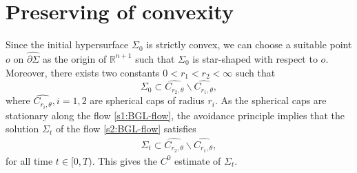 \documentclass[11pt,reqno]{amsart}
\theoremstyle{definition}
\theoremstyle{remark}
\numberwithin{equation}{section}
\renewcommand{\(}{\left(}
\renewcommand{\)}{\right)}
\renewcommand{\-}{\overline}
\renewcommand{\t}{\theta}
\begin{document}
\section{Preserving of convexity}\label{sec:5}

Since the initial hypersurface $\Sigma_0$ is strictly convex, we can choose a suitable point $o$ on $\widehat{\partial\Sigma}$ as the origin of $\mathbb{R}^{n+1}$ such that $\Sigma_0$ is star-shaped with respect to $o$. Moreover, there exists two constants $0<r_1<r_2<\infty$ such that
\begin{equation*}
  \Sigma_0 \subset \widehat{C_{r_2,\t}} \backslash \widehat{C_{r_1,\t}},
\end{equation*}
where $\widehat{C_{r_i,\t}}, i=1,2$ are spherical caps of radius $r_i$. As the spherical caps are stationary along the flow \eqref{s1:BGL-flow}, the avoidance principle implies that the solution $\Sigma_t$ of the flow \eqref{s2:BGL-flow} satisfies
\begin{align}\label{s4:barrier-estimate}
	\Sigma_t \subset \widehat{C_{r_2,\t}} \backslash \widehat{C_{r_1,\t}},
	\end{align}
for all time  $t\in [0,T)$. This gives the $C^0$ estimate of $\Sigma_t$.
\end{document}
